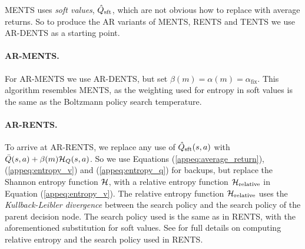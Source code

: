 


            MENTS uses \textit{soft values}, $\hat{Q}_{\textnormal{sft}}$, which are not obvious how to replace with average returns. So to produce the AR variants of MENTS, RENTS and TENTS we use AR-DENTS as a starting point. 

            \paragraph{AR-MENTS.} For AR-MENTS we use AR-DENTS, but set $\beta(m)=\alpha(m)=\alpha_{\text{fix}}$. This algorithm resembles MENTS, as the weighting used for entropy in soft values is the same as the Boltzmann policy search temperature. 

            \paragraph{AR-RENTS.} To arrive at AR-RENTS, we replace any use of $\hat{Q}_{\textnormal{sft}}(s,a)$ with $\bar{Q}(s,a)+\beta(m)\mathcal{H}_Q(s,a)$. So we use Equations (\ref{appeq:average_return}), (\ref{appeq:entropy_v}) and (\ref{appeq:entropy_q}) for backups, but replace the Shannon entropy function $\mathcal{H}$, with a relative entropy function $\mathcal{H}_{\textnormal{relative}}$ in Equation (\ref{appeq:entropy_v}). The relative entropy function $\mathcal{H}_{\textnormal{relative}}$ uses the \textit{Kullback-Leibler divergence} between the search policy and the search policy of the parent decision node. The search policy used is the same as in RENTS, with the aforementioned substitution for soft values. See %
             for full details on computing relative entropy and the search policy used in RENTS. 

